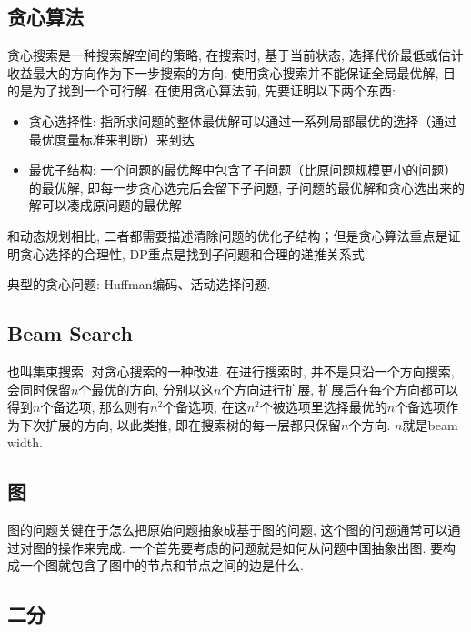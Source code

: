 \subsection{贪心算法}
贪心搜索是一种搜索解空间的策略, 在搜索时, 基于当前状态, 选择代价最低或估计收益最大的方向作为下一步搜索的方向. 使用贪心搜索并不能保证全局最优解, 目的是为了找到一个可行解. 在使用贪心算法前, 先要证明以下两个东西: 
\begin{itemize}
	\item 贪心选择性: 指所求问题的整体最优解可以通过一系列局部最优的选择（通过最优度量标准来判断）来到达
	\item 最优子结构: 一个问题的最优解中包含了子问题（比原问题规模更小的问题）的最优解, 即每一步贪心选完后会留下子问题, 子问题的最优解和贪心选出来的解可以凑成原问题的最优解
\end{itemize}
和动态规划相比, 二者都需要描述清除问题的优化子结构；但是贪心算法重点是证明贪心选择的合理性, DP重点是找到子问题和合理的递推关系式. 

典型的贪心问题: Huffman编码、活动选择问题. 



\subsection{Beam Search}
也叫集束搜索. 
对贪心搜索的一种改进. 在进行搜索时, 并不是只沿一个方向搜索, 会同时保留$n$个最优的方向, 分别以这$n$个方向进行扩展, 扩展后在每个方向都可以得到$n$个备选项, 那么则有$n^2$个备选项, 在这$n^2$个被选项里选择最优的$n$个备选项作为下次扩展的方向, 以此类推, 即在搜索树的每一层都只保留$n$个方向. $n$就是beam width. 

\subsection{图}
图的问题关键在于怎么把原始问题抽象成基于图的问题, 这个图的问题通常可以通过对图的操作来完成. 一个首先要考虑的问题就是如何从问题中国抽象出图. 要构成一个图就包含了图中的节点和节点之间的边是什么. 

\subsection{二分}
